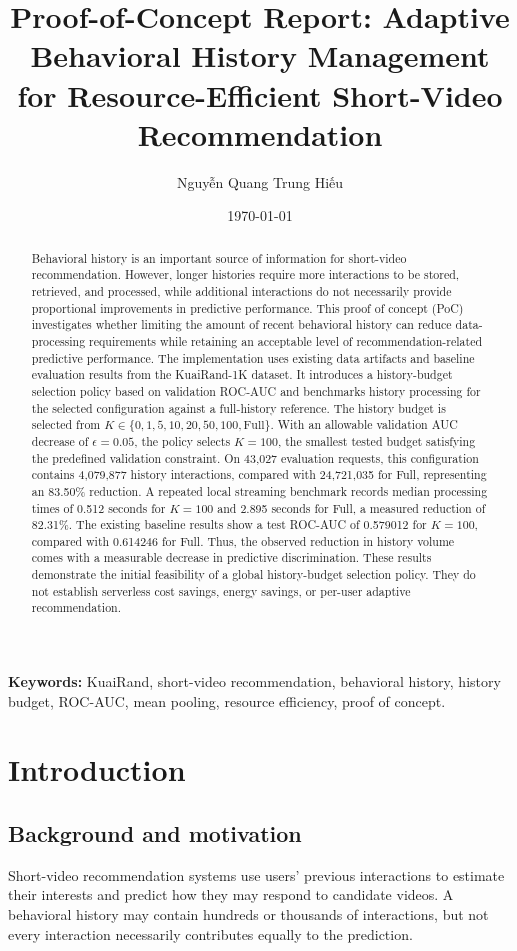 \documentclass[11pt,a4paper]{article}
\title{\textbf{Proof-of-Concept Report: Adaptive Behavioral History Management for Resource-Efficient Short-Video Recommendation}}
\author{Nguyễn Quang Trung Hiếu}
\date{\today}
\begin{document}
\maketitle

\begin{abstract}
Behavioral history is an important source of information for short-video recommendation. However, longer histories require more interactions to be stored, retrieved, and processed, while additional interactions do not necessarily provide proportional improvements in predictive performance. This proof of concept (PoC) investigates whether limiting the amount of recent behavioral history can reduce data-processing requirements while retaining an acceptable level of recommendation-related predictive performance. The implementation uses existing data artifacts and baseline evaluation results from the KuaiRand-1K dataset. It introduces a history-budget selection policy based on validation ROC-AUC and benchmarks history processing for the selected configuration against a full-history reference. The history budget is selected from $K \in \{0, 1, 5, 10, 20, 50, 100, \mathrm{Full}\}$. With an allowable validation AUC decrease of $\epsilon = 0.05$, the policy selects $K = 100$, the smallest tested budget satisfying the predefined validation constraint. On 43,027 evaluation requests, this configuration contains 4,079,877 history interactions, compared with 24,721,035 for Full, representing an 83.50\% reduction. A repeated local streaming benchmark records median processing times of 0.512 seconds for $K = 100$ and 2.895 seconds for Full, a measured reduction of 82.31\%. The existing baseline results show a test ROC-AUC of 0.579012 for $K = 100$, compared with 0.614246 for Full. Thus, the observed reduction in history volume comes with a measurable decrease in predictive discrimination. These results demonstrate the initial feasibility of a global history-budget selection policy. They do not establish serverless cost savings, energy savings, or per-user adaptive recommendation.
\end{abstract}

\noindent\textbf{Keywords:} KuaiRand, short-video recommendation, behavioral history, history budget, ROC-AUC, mean pooling, resource efficiency, proof of concept.

\section{Introduction}
\subsection{Background and motivation}
Short-video recommendation systems use users' previous interactions to estimate their interests and predict how they may respond to candidate videos. A behavioral history may contain hundreds or thousands of interactions, but not every interaction necessarily contributes equally to the prediction.
\end{document}
